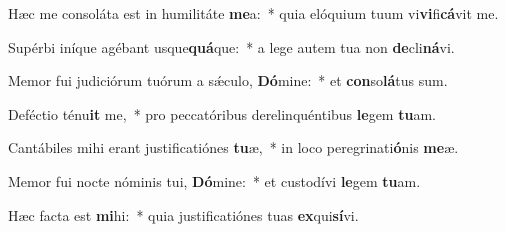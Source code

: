 \item Hæc me consoláta est in humilitáte \textbf{me}a:~* quia elóquium tuum vi\textbf{vi}fi\textbf{cá}vit me.
\item Supérbi iníque agébant usque\textbf{quá}que:~* a lege autem tua non \textbf{de}cli\textbf{ná}vi.
\item Memor fui judiciórum tuórum a sǽculo, \textbf{Dó}mine:~* et \textbf{con}so\textbf{lá}tus sum.
\item Deféctio ténu\textbf{it} me,~* pro peccatóribus derelinquéntibus \textbf{le}gem \textbf{tu}am.
\item Cantábiles mihi erant justificatiónes \textbf{tu}æ,~* in loco peregrinati\textbf{ó}nis \textbf{me}æ.
\item Memor fui nocte nóminis tui, \textbf{Dó}mine:~* et custodívi \textbf{le}gem \textbf{tu}am.
\item Hæc facta est \textbf{mi}hi:~* quia justificatiónes tuas \textbf{ex}qui\textbf{sí}vi.
